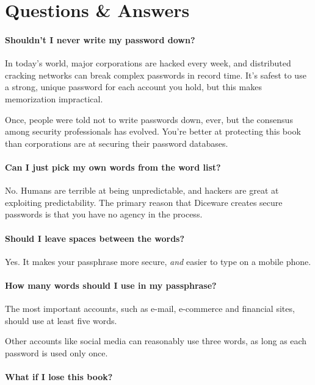 \chapter*{Questions \& Answers}
\small

\subsubsection{Shouldn't I never write my password down?}

In today's world, major corporations are hacked every week, and distributed cracking networks can break complex passwords in record time. It's safest to use a strong, unique password for each account you hold, but this makes memorization impractical. 

Once, people were told not to write passwords down, ever, but the consensus among security professionals has evolved. You're better at protecting this book than corporations are at securing their password databases. 

\subsubsection{Can I just pick my own words from the word list?}

No. Humans are terrible at being unpredictable, and hackers are great at exploiting predictability. The primary reason that Diceware creates secure passwords is that you have no agency in the process.

\subsubsection{Should I leave spaces between the words?}

Yes. It makes your passphrase more secure, \textit{and} easier to type on a mobile phone.

\subsubsection{How many words should I use in my passphrase?}

The most important accounts, such as e-mail, e-commerce and financial sites, should use at least five words.

Other accounts like social media can reasonably use three words, as long as each password is used only once.

\subsubsection{What if I lose this book?}

